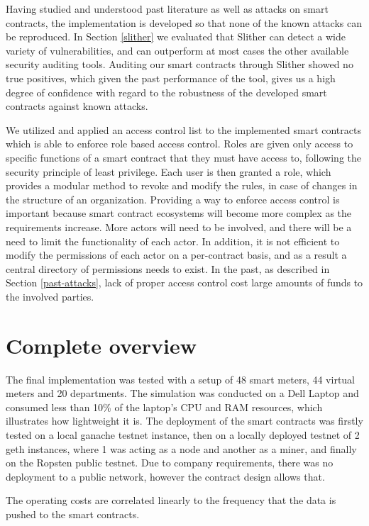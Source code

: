 Having studied and understood past literature as well as attacks on smart contracts, the implementation is developed so that none of the known attacks can be reproduced. In Section \ref{slither} we evaluated that Slither can detect a wide variety of vulnerabilities, and can outperform at most cases the other available security auditing tools. Auditing our smart contracts through Slither showed no true positives, which given the past performance of the tool, gives us a high degree of confidence with regard to the robustness of the developed smart contracts against known attacks.

We utilized and applied an access control list to the implemented smart contracts which is able to enforce role based access control. Roles are given only access to specific functions of a smart contract that they must have access to, following the security principle of least privilege. Each user is then granted a role, which provides a modular method to revoke and modify the rules, in case of changes in the structure of an organization. Providing a way to enforce access control is important because smart contract ecosystems will become more complex as the requirements increase. More actors will need to be involved, and there will be a need to limit the functionality of each actor. In addition, it is not efficient to modify the permissions of each actor on a per-contract basis, and as a result a central directory of permissions needs to exist. In the past, as described in Section \ref{past-attacks}, lack of proper access control cost large amounts of funds to the involved parties.

\section{Complete overview}
The final implementation was tested with a setup of 48 smart meters, 44 virtual meters and 20 departments. The simulation was conducted on a Dell Laptop and consumed less than 10\% of the laptop's CPU and RAM resources, which illustrates how lightweight it is. The deployment of the smart contracts was firstly tested on a local ganache testnet instance, then on a locally deployed testnet of 2 geth instances, where 1 was acting as a node and another as a miner, and finally on the Ropsten public testnet. Due to company requirements, there was no deployment to a public network, however the contract design allows that. 

The operating costs are correlated linearly to the frequency that the data is pushed to the smart contracts. 

